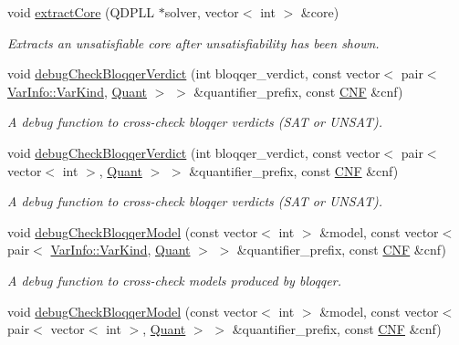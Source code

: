 \begin{DoxyCompactItemize}
void \hyperlink{classDepQBFApi_ad65a2e0366a4af8e3a436cf3b8ef5721}{extract\-Core} (Q\-D\-P\-L\-L $\ast$solver, vector$<$ int $>$ \&core)
\begin{DoxyCompactList}\small\item\em Extracts an unsatisfiable core after unsatisfiability has been shown. \end{DoxyCompactList}\item 
void \hyperlink{classDepQBFApi_a3a24cd04a3ddc626f2933429dda4e3b9}{debug\-Check\-Bloqqer\-Verdict} (int bloqqer\-\_\-verdict, const vector$<$ pair$<$ \hyperlink{classVarInfo_a64d1da76cf84fe674e5fef9764ef11cf}{Var\-Info\-::\-Var\-Kind}, \hyperlink{classQBFSolver_ac091e263cb55286cc07b2451bcf4d3c7}{Quant} $>$ $>$ \&quantifier\-\_\-prefix, const \hyperlink{classCNF}{C\-N\-F} \&cnf)
\begin{DoxyCompactList}\small\item\em A debug function to cross-\/check bloqqer verdicts (S\-A\-T or U\-N\-S\-A\-T). \end{DoxyCompactList}\item 
void \hyperlink{classDepQBFApi_afe717cb04d4bd6223bca3e52ba2c7e1f}{debug\-Check\-Bloqqer\-Verdict} (int bloqqer\-\_\-verdict, const vector$<$ pair$<$ vector$<$ int $>$, \hyperlink{classQBFSolver_ac091e263cb55286cc07b2451bcf4d3c7}{Quant} $>$ $>$ \&quantifier\-\_\-prefix, const \hyperlink{classCNF}{C\-N\-F} \&cnf)
\begin{DoxyCompactList}\small\item\em A debug function to cross-\/check bloqqer verdicts (S\-A\-T or U\-N\-S\-A\-T). \end{DoxyCompactList}\item 
void \hyperlink{classDepQBFApi_a55a75bae106e42f6df73fb129a18b4bb}{debug\-Check\-Bloqqer\-Model} (const vector$<$ int $>$ \&model, const vector$<$ pair$<$ \hyperlink{classVarInfo_a64d1da76cf84fe674e5fef9764ef11cf}{Var\-Info\-::\-Var\-Kind}, \hyperlink{classQBFSolver_ac091e263cb55286cc07b2451bcf4d3c7}{Quant} $>$ $>$ \&quantifier\-\_\-prefix, const \hyperlink{classCNF}{C\-N\-F} \&cnf)
\begin{DoxyCompactList}\small\item\em A debug function to cross-\/check models produced by bloqqer. \end{DoxyCompactList}\item 
void \hyperlink{classDepQBFApi_ab8f1fa3fa93a7c6877b22579305f22f5}{debug\-Check\-Bloqqer\-Model} (const vector$<$ int $>$ \&model, const vector$<$ pair$<$ vector$<$ int $>$, \hyperlink{classQBFSolver_ac091e263cb55286cc07b2451bcf4d3c7}{Quant} $>$ $>$ \&quantifier\-\_\-prefix, const \hyperlink{classCNF}{C\-N\-F} \&cnf)

\end{DoxyCompactItemize}
